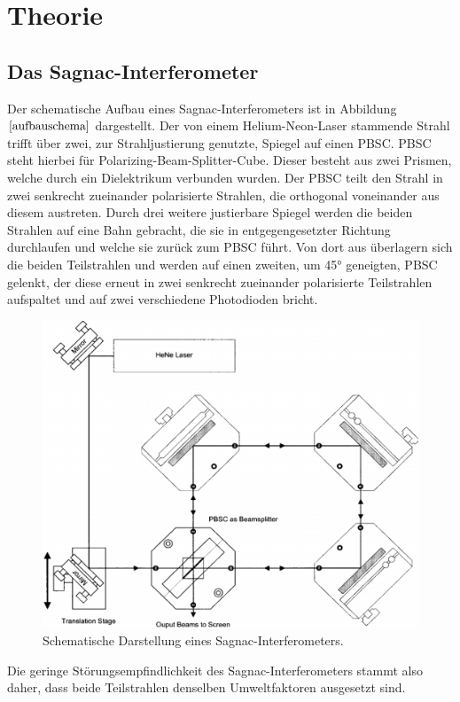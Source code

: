 \section{Theorie}
\subsection{Das Sagnac-Interferometer}
Der schematische Aufbau eines Sagnac-Interferometers ist in Abbildung $\ref{aufbauschema}$ dargestellt.
Der von einem Helium-Neon-Laser stammende Strahl trifft über zwei, zur Strahljustierung genutzte,
Spiegel auf einen PBSC. PBSC steht hierbei für  Polarizing-Beam-Splitter-Cube. Dieser besteht aus zwei Prismen, welche durch ein
Dielektrikum verbunden wurden. Der PBSC teilt den Strahl in zwei senkrecht zueinander
polarisierte Strahlen, die orthogonal voneinander aus diesem austreten. Durch drei weitere justierbare Spiegel werden die beiden Strahlen auf eine Bahn gebracht, die sie in entgegengesetzter Richtung durchlaufen
und welche sie zurück zum PBSC führt. Von dort aus überlagern sich die beiden Teilstrahlen und werden auf einen zweiten, um 45° geneigten, PBSC gelenkt, der diese erneut in zwei senkrecht zueinander polarisierte Teilstrahlen aufspaltet
und auf zwei verschiedene Photodioden bricht.
\begin{figure}[H]
  \centering
  \includegraphics[scale=0.35]{Bilder/schema.png}
  \caption{Schematische Darstellung eines Sagnac-Interferometers.\cite{anleitung}}
  \label{aufbauschema}
\end{figure}
\newpage
Die geringe Störungsempfindlichkeit des Sagnac-Interferometers stammt also daher, dass beide Teilstrahlen denselben Umweltfaktoren ausgesetzt sind.

